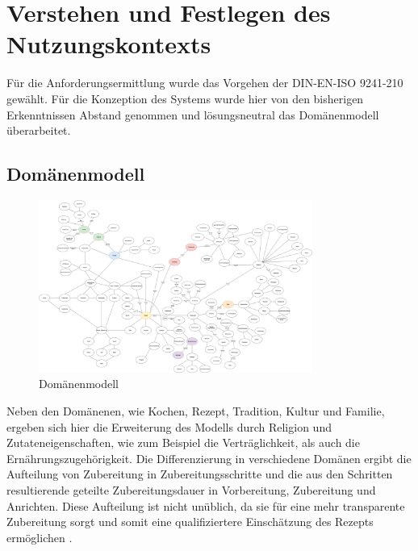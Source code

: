 \chapter{Verstehen und Festlegen des Nutzungskontexts}
Für die Anforderungsermittlung wurde das Vorgehen der DIN-EN-ISO 9241-210 \citep{DINISO_2010} gewählt. Für die Konzeption des Systems wurde hier von den bisherigen Erkenntnissen Abstand genommen und lösungsneutral das Domänenmodell überarbeitet.

\section{Domänenmodell}
\begin{figure}[h] %
    \centering
    \includegraphics[width=0.8\textwidth]{images/domainmodel.png}
    \caption[Domänenmodell]{Domänenmodell}
    \label{fig:Domaenenmodell}
\end{figure}
Neben den Domänenen, wie Kochen, Rezept, Tradition, Kultur und Familie, ergeben sich hier die Erweiterung des Modells durch Religion und Zutateneigenschaften, wie zum Beispiel die Verträglichkeit, als auch die Ernährungszugehörigkeit. 
Die Differenzierung in verschiedene Domänen ergibt die Aufteilung von Zubereitung in Zubereitungsschritte und die aus den Schritten resultierende geteilte Zubereitungsdauer in Vorbereitung, Zubereitung und Anrichten. 
Diese Aufteilung ist nicht unüblich, da sie für eine mehr transparente Zubereitung sorgt und somit eine qualifiziertere Einschätzung des Rezepts ermöglichen \citep{SlowBake13:online}.\\

